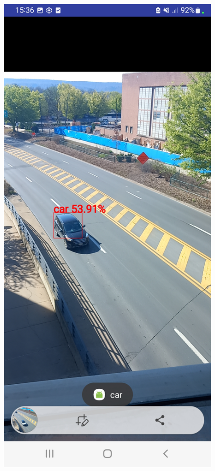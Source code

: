 \begin{figure}[H]
    \centering
    \includegraphics[scale=0.15]{figure/ObjectDetection_car.jpg}

\end{figure}
